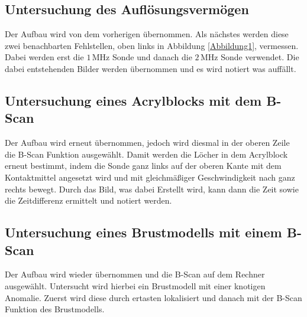 \subsection{Untersuchung des Auflösungsvermögen}

\begin{flushleft}
    Der Aufbau wird von dem vorherigen übernommen.
    Als nächstes werden diese zwei benachbarten Fehlstellen, oben links in Abbildung \ref{Abbildung1}, vermessen. 
    Dabei werden erst die $1\,\unit{\mega\hertz}$ Sonde und danach die $2\,\unit{\mega\hertz}$ Sonde verwendet.
    Die dabei entstehenden Bilder werden übernommen und es wird notiert was auffällt.
\end{flushleft}

\subsection{Untersuchung eines Acrylblocks mit dem B-Scan}

\begin{flushleft}
    Der Aufbau wird erneut übernommen, jedoch wird diesmal in der oberen Zeile die B-Scan Funktion ausgewählt.
    Damit werden die Löcher in dem Acrylblock erneut bestimmt, indem die Sonde ganz links auf der oberen Kante mit dem Kontaktmittel angesetzt wird und mit gleichmäßiger Geschwindigkeit nach ganz rechts bewegt.
    Durch das Bild, was dabei Erstellt wird, kann dann die Zeit sowie die Zeitdifferenz ermittelt und notiert werden.
\end{flushleft}

\subsection{Untersuchung eines Brustmodells mit einem B-Scan}

\begin{flushleft}
    Der Aufbau wird wieder übernommen und die B-Scan auf dem Rechner ausgewählt.
    Untersucht wird hierbei ein Brustmodell mit einer knotigen Anomalie. 
    Zuerst wird diese durch ertasten lokalisiert und danach mit der B-Scan Funktion des Brustmodells.
\end{flushleft}